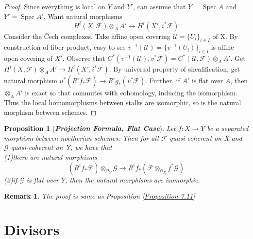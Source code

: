 \documentclass{ctexart}
\newtheorem{remark}{Remark}[section]
\newtheorem{proposition}{Proposition}[section]
\newcommand{\spec}{\operatorname{Spec}}
\begin{document}
\begin{proof}
    Since everything is local on $Y$ and $Y'$, can assume that $Y = \spec A$ and $Y' = \spec A'$.
    Want natural morphisms 
    \begin{equation*}
        H^{i}(X, \mathcal{F}) \otimes_{A} A' \longrightarrow H^{i}(X', i^{\ast}\mathcal{F})
    \end{equation*}
    Consider the Čech complexes.
    Take affine open covering $\mathcal{U} = \{U_{i}\}_{i\in I}$ of X.
    By construction of fiber product, easy to see $v^{-1}(\mathcal{U}) = \{v^{-1}(U_{i})\}_{i\in I}$ is affine open covering of $X'$.
    Observe that $C^{\ast}(v^{-1}(\mathcal{U}), v^{\ast}\mathcal{F}) = C^{\ast}(\mathcal{U}, \mathcal{F}) \otimes_{A} A'$.
    Get $H^{i}(X, \mathcal{F}) \otimes_{A} A' \longrightarrow H^{i}(X', i^{\ast}\mathcal{F})$.
    By universal property of sheafification, get natural morphism $u^{\ast}(R^{i}f_{\ast}\mathcal{F}) \longrightarrow R^{i}g_{\ast}(v^{\ast}\mathcal{F})$.
    Further, if $A'$ is flat over $A$,
    then $\otimes_{A} A'$ is exact so that commutes with cohomology, inducing the isomorphism.
    Thus the local homomorphisms between stalks are isomorphic, so is the natural morphism between schemes.
\end{proof}
\begin{proposition}[\textbf{\emph{Projection Formula, Flat Case}}]
    Let $f: X \longrightarrow Y$ be a separated morphism between noetherian schemes.
    Then for all $\mathcal{F}$ quasi-coherent on X and $\mathcal{G}$ quasi-coherent on Y, we have that \\
    (1)there are natural morphisms 
    \begin{equation*}
        (R^{i}f_{\ast}\mathcal{F}) \otimes_{\mathcal{O}_{Y}} \mathcal{G} \longrightarrow R^{i}f_{\ast}(\mathcal{F} \otimes_{\mathcal{O}_{X}} f^{\ast}\mathcal{G})
    \end{equation*}
    (2)if $\mathcal{G}$ is flat over $Y$, then the natural morphisms are isomorphic.
    \label{Proposition 7.12}
\end{proposition}
\begin{remark}
    The proof is same as Proposition \ref{Proposition 7.11}
\end{remark}

\section{Divisors}
\label{section:Divisors}
\end{document}
